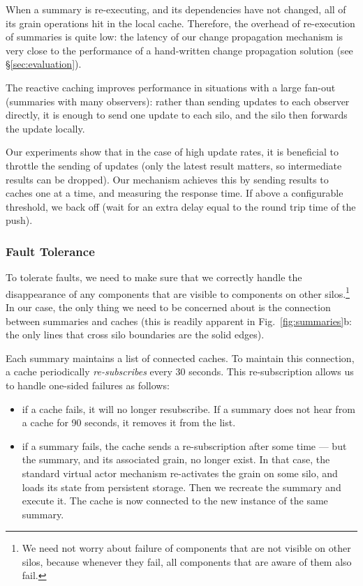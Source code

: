  When a summary is re-executing, and its dependencies have not changed, all of its grain operations hit in the local cache. Therefore, the overhead of re-execution of summaries is quite low: the latency of our change propagation mechanism is very close to the performance of a hand-written change propagation solution (see \S\ref{sec:evaluation}).

 The reactive caching improves performance in situations with a large fan-out (summaries with many observers): rather than sending updates to each observer directly, it is enough to send one update to each silo, and the silo then forwards the update locally.

Our experiments show that in the case of high update rates, it is beneficial to throttle the sending of updates (only the latest result matters, so intermediate results can be dropped). Our mechanism achieves this by sending results to caches one at a time, and measuring the response time. If above a configurable threshold, we back off (wait for an extra delay equal to the round trip time of the push). 

\subsubsection{Fault Tolerance}\label{sec:ft}

To tolerate faults, we need to make sure that we correctly handle the disappearance of any components that are visible to components on other silos.\footnote{We need not worry about failure of components that are not visible on other silos, because whenever they fail, all components that are aware of them also fail.} In our case, the only thing we need to be concerned about is the connection between summaries and caches (this is readily apparent in Fig.~\ref{fig:summaries}b: the only lines that cross silo boundaries are the solid edges).

Each summary maintains a list of connected caches. To maintain this connection, a cache periodically \emph{re-subscribes} every 30 seconds. This re-subscription allows us to handle one-sided failures as follows:
\begin{itemize}
\item if a cache fails, it will no longer resubscribe. If a summary does not hear from a cache for 90 seconds, it removes it from the list. 
\item if a summary fails, the cache sends a re-subscription after some time --- but the summary, and its associated grain, no longer exist. In that case, the standard virtual actor mechanism re-activates the grain on some silo, and loads its state from persistent storage. Then we recreate the summary and execute it. The cache is now connected to the new instance of the same summary. 
\end{itemize}
